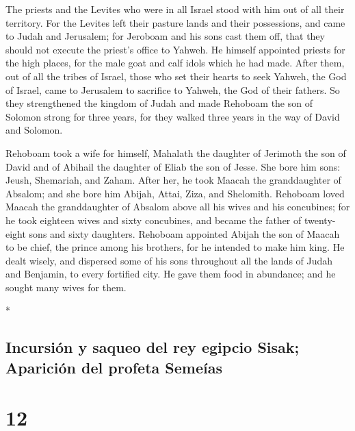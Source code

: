 \begin{paracol}{2}
\begin{otherlanguage}{english}
 The priests and the Levites who were in all Israel stood
with him out of all their territory.  For the Levites
left their pasture lands and their possessions, and came to Judah and
Jerusalem; for Jeroboam and his sons cast them off, that they should not
execute the priest's office to Yahweh.  He himself
appointed priests for the high places, for the male goat and calf idols
which he had made.  After them, out of all the tribes of
Israel, those who set their hearts to seek Yahweh, the God of Israel,
came to Jerusalem to sacrifice to Yahweh, the God of their fathers.
 So they strengthened the kingdom of Judah and made
Rehoboam the son of Solomon strong for three years, for they walked
three years in the way of David and Solomon.

 Rehoboam took a wife for himself, Mahalath the daughter
of Jerimoth the son of David and of Abihail the daughter of Eliab the
son of Jesse.  She bore him sons: Jeush, Shemariah, and
Zaham.  After her, he took Maacah the granddaughter of
Absalom; and she bore him Abijah, Attai, Ziza, and Shelomith.
 Rehoboam loved Maacah the granddaughter of Absalom above
all his wives and his concubines; for he took eighteen wives and sixty
concubines, and became the father of twenty-eight sons and sixty
daughters.  Rehoboam appointed Abijah the son of Maacah
to be chief, the prince among his brothers, for he intended to make him
king.  He dealt wisely, and dispersed some of his sons
throughout all the lands of Judah and Benjamin, to every fortified city.
He gave them food in abundance; and he sought many wives for them.

\end{otherlanguage}

\switchcolumn[0]*

\hypertarget{incursiuxf3n-y-saqueo-del-rey-egipcio-sisak-apariciuxf3n-del-profeta-semeuxedas}{%
\subsection{Incursión y saqueo del rey egipcio Sisak; Aparición del
profeta
Semeías}\label{incursiuxf3n-y-saqueo-del-rey-egipcio-sisak-apariciuxf3n-del-profeta-semeuxedas}}

\hypertarget{section-22}{%
\section{12}\label{section-22}}


\end{paracol}
